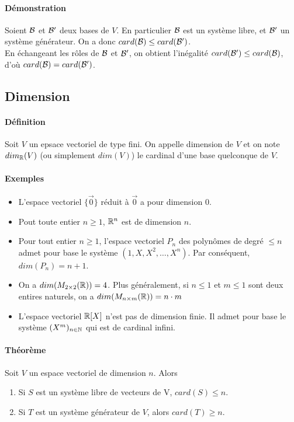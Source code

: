 \paragraph{Démonstration} Soient $\mathcal{B}$ et $\mathcal{B}'$ deux bases de $V$. En particulier $\mathcal{B}$ est un système libre, et $\mathcal{B}'$ un système générateur. On a donc $card(\mathcal{B}) \leq card(\mathcal{B}')$. \\
En échangeant les rôles de $\mathcal{B}$ et $\mathcal{B}'$, on obtient l'inégalité $card(\mathcal{B}') \leq card(\mathcal{B})$, d'où $card(\mathcal{B}) = card(\mathcal{B}')$.

%
\subsection{Dimension}
%
\paragraph{Définition} Soit $V$ un epsace vectoriel de type fini. On appelle dimension de $V$ et on note $dim_{\mathbb{R}}(V)$ (ou simplement $dim(V)$) le cardinal d'une base quelconque de $V$.
\paragraph{Exemples}
\begin{itemize}
  \item L'espace vectoriel $\{ \vec{0} \}$ réduit à $\vec{0}$ a pour dimension $0$.
  \item Pout toute entier $n \geq 1$, $\mathbb{R}^n$ est de dimension $n$.
  \item Pour tout entier $n \geq 1$, l'espace vectoriel $P_n$ des polynômes de degré $\leq n$ admet pour base le système $(1, X, X^2, \ldots, X^n)$. Par conséquent, $dim(P_n) = n+1$.
  \item On a $dim(M_{2\times 2}(\mathbb{R}) ) = 4$. Plus généralement, si $n \leq 1$ et $m \leq 1$ sont deux entires naturels, on a $dim( M_{n\times m}(\mathbb{R}) ) = n\cdot m$
  \item L'espace vectoriel $\mathbb{R}[X]$ n'est pas de dimension finie. Il admet pour base le système $(X^m)_{n \in \mathbb{N}}$ qui est de cardinal infini. %
\end{itemize}

\paragraph{Théorème} Soit $V$ un espace vectoriel de dimension $n$. Alors 
\begin{enumerate}
  \item Si $S$ est un système libre de vecteurs de V,  $card(S) \leq n$.
  \item Si $T$ est un système générateur de $V$, alors $card(T) \geq n$.
\end{enumerate}

